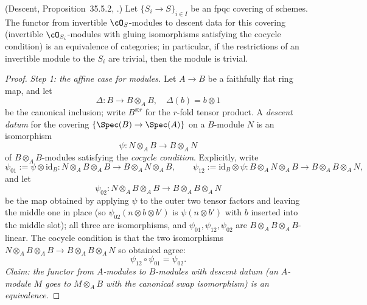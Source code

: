 \begin{lemma}
\label{lem:pc-fpqc-descent}
(Descent, Proposition~35.5.2,
.)  Let
$\{S_i\to S\}_{i\in I}$ be an fpqc covering of schemes.  The functor from
invertible $\cO_S$-modules to descent data for this covering (invertible
$\cO_{S_i}$-modules with gluing isomorphisms satisfying the cocycle
condition) is an equivalence of categories; in particular, if the
restrictions of an invertible module to the $S_i$ are trivial, then the
module is trivial.
\end{lemma}
\begin{proof}
\emph{Step 1: the affine case for modules.}  Let $A\to B$ be a faithfully
flat ring map, and let
\[
\Delta:B\longrightarrow B\otimes_AB,\quad \Delta(b)=b\otimes1
\]
be the canonical inclusion; write $B^{\otimes r}$ for the $r$-fold
tensor product.  A \emph{descent datum} for the covering
$\{\Spec(B)\to\Spec(A)\}$ on a $B$-module $N$ is an isomorphism
\[
\psi:N\otimes_AB\longrightarrow B\otimes_AN
\]
of $B\otimes_AB$-modules satisfying the
\emph{cocycle condition}.  Explicitly, write
\[
\psi_{01}:=\psi\otimes\mathrm{id}_B:
N\otimes_AB\otimes_AB\longrightarrow B\otimes_AN\otimes_AB,
\qquad
\psi_{12}:=\mathrm{id}_B\otimes\psi:
B\otimes_AN\otimes_AB\longrightarrow B\otimes_AB\otimes_AN,
\]
and let
\[
\psi_{02}:N\otimes_AB\otimes_AB\longrightarrow B\otimes_AB\otimes_AN
\]
be the map obtained by applying $\psi$ to the outer two tensor factors
and leaving the middle one in place (so $\psi_{02}(n\otimes b\otimes b')$
is $\psi(n\otimes b')$ with $b$ inserted into the middle slot); all three
are isomorphisms, and $\psi_{01},\psi_{12},\psi_{02}$ are
$B\otimes_AB\otimes_AB$-linear.  The cocycle condition is that the two
isomorphisms $N\otimes_AB\otimes_AB\to B\otimes_AB\otimes_AN$ so obtained
agree:
\[
\psi_{12}\circ\psi_{01}=\psi_{02}.
\]  \emph{Claim: the functor from $A$-modules to
$B$-modules with descent datum (an $A$-module $M$ goes to
$M\otimes_AB$ with the canonical swap isomorphism) is an equivalence.}


\end{proof}
